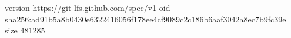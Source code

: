version https://git-lfs.github.com/spec/v1
oid sha256:ad91b5a8b0430e6322416056f178ee4cf9089c2c186b6aaf3042a8ec7b9fc39e
size 481285
